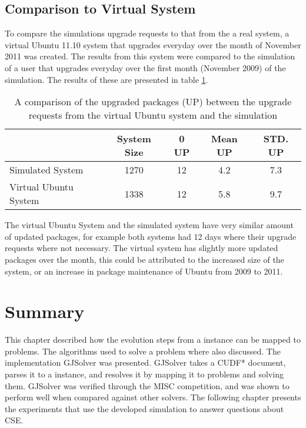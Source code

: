 \subsection{Comparison to Virtual System}
To compare the simulations upgrade requests to that from the a real system, a virtual Ubuntu 11.10 system that upgrades everyday over the month of November 2011 was created.
The results from this system were compared to the simulation of a user that upgrades everyday over the first month (November 2009) of the simulation.
The results of these are presented in table \ref{implementation.validvirtual}.
\begin{table}[htp]
\begin{center}
\begin{tabular}{| l | c |  c | c | c |}
\hline
&	System Size & 0 UP & Mean UP & STD. UP \\ \hline
Simulated System			& 1270 	& 12	 	& 4.2 		 	& 7.3 	\\
Virtual Ubuntu System 		& 1338 	& 12 		& 5.8 	 		& 9.7 	\\ \hline
\end{tabular}
\end{center}
\caption[Comparison of upgraded packages between the virtual Ubuntu 11.10 system and the simulation.]{A comparison of the upgraded packages (UP) between the upgrade requests from the virtual Ubuntu system and the simulation}
\label{implementation.validvirtual}
\end{table}

The virtual Ubuntu System and the simulated system have very similar amount of updated packages,
for example both systems had 12 days where their upgrade requests where not necessary.
The virtual system has slightly more updated packages over the month,
this could be attributed to the increased size of the system, or an increase in package maintenance of Ubuntu from 2009 to 2011. 

\section{Summary}
This chapter described how the evolution steps from a \modelname instance can be mapped to \modelimpl problems.
The algorithms used to solve a \modelimpl problem where also discussed.
The implementation GJSolver was presented.
GJSolver takes a CUDF* document, parses it to a \modelname instance, and resolves it by mapping it to \modelimpl problems and solving them.
GJSolver was verified through the MISC competition, and was shown to perform well when compared against other solvers.
The following chapter presents the experiments that use the developed simulation to answer questions about CSE.
